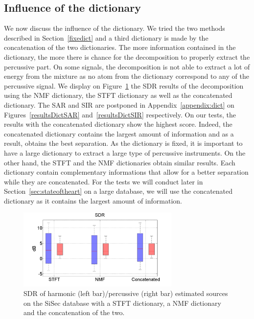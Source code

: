 \subsection{Influence of the dictionary}
\label{setup:dictionary}

We now discuss the influence of the dictionary. We tried the two methods described in Section~\ref{fixedict} and a third dictionary is made by the concatenation of the two dictionaries. The more information contained in the dictionary, the more there is chance for the decomposition to properly extract the percussive part. On some signals, the decomposition is not able to extract a lot of energy from the mixture as no atom from the dictionary correspond to any of the percussive signal.
We display on Figure~\ref{resultsDict} the SDR results of the decomposition using the NMF dictionary, the STFT dictionary as well as the concatenated dictionary. The SAR and SIR are postponed in Appendix~\ref{appendix:dict} on Figures~\ref{resultsDictSAR} and~\ref{resultsDictSIR} respectively. On our tests, the results with the concatenated dictionary show the highest score. Indeed, the concatenated dictionary contains the largest amount of information and as a result, obtains the best separation. As the dictionary is fixed, it is important to have a large dictionary to extract a large type of percussive instruments. On the other hand, the STFT and the NMF dictionaries obtain similar results. Each dictionary contain complementary informations that allow for a better separation while they are concatenated. For the tests we will conduct later in Section~\ref{sec:stateoftheart} on a large database, we will use the concatenated dictionary as it contains the largest amount of information. 


\begin{figure}[htb]

  \centering 
  \includegraphics[width=8cm]{fig/DictSDR}
  \caption{\label{resultsDict} SDR of harmonic (left bar)/percussive (right bar) estimated sources on the SiSec database with a STFT dictionary, a NMF dictionary and the concatenation of the two.}
  
\end{figure}


